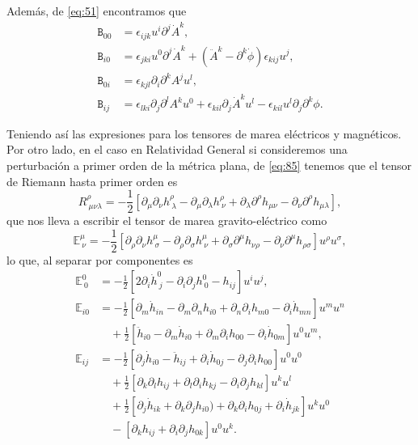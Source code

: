 Además, de \eqref{eq:51} encontramos que
\begin{align}
\mathtt{B}_{00} &= \epsilon_{ijk}u^i \partial^j \dot{A}^k, \\
\mathtt{B}_{i0} &= \epsilon_{jki}u^0 \partial^j\dot{A}^k + (\ddot{A}^k - \partial^k \dot{\phi}) \epsilon_{kij}u^j, \\
\mathtt{B}_{0i} &= \epsilon_{kjl}\partial_i \partial^k A^j u^l, \\
\mathtt{B}_{ij} &= \epsilon_{lki}\partial_j \partial^l A^k u^0 + \epsilon_{kil}\partial_j \dot{A}^k u^l
- \epsilon_{kil} u^l \partial_j \partial^k \phi.
\end{align}

Teniendo así las expresiones para los tensores de marea eléctricos y magnéticos. Por otro lado, en el caso en Relatividad General si consideremos una perturbación a primer orden de la métrica plana, de \eqref{eq:85} tenemos que el tensor de Riemann hasta primer orden es
\begin{equation}
R^{\rho}_{\ \mu \nu \lambda} = -\frac{1}{2} \left[ \partial_{\mu} \partial_{\nu} h^{\rho}_{\ \lambda} - \partial_{\mu} \partial_{\lambda} h^{\rho}_{\ \nu} + \partial_{\lambda} \partial^{\rho} h_{\mu \nu} - \partial_{\nu} \partial^{\rho} h_{\mu \lambda} \right],
\end{equation}
que nos lleva a escribir el tensor de marea gravito-eléctrico como
\begin{equation}
\mathbb{E}^{\mu}_{\ \nu} = -\frac{1}{2} \left[ \partial_{\rho} \partial_{\nu} h^{\mu}_{\ \sigma} - \partial_{\rho} \partial_{\sigma} h^{\mu}_{\ \nu} + \partial_{\sigma} \partial^{\mu} h_{\nu \rho} - \partial_{\nu} \partial^{\mu} h_{\rho \sigma} \right] u^{\rho} u^{\sigma},
\end{equation}
lo que, al separar por componentes es
\begin{align}
\mathbb{E}^0_{\ 0} &= -\frac{1}{2} \left[ 2 \partial_i \dot{h}^0_{\ j} - \partial_i \partial_j h^0_{\ 0} - h_{ij} \right] u^i u^j,\\
\nonumber
\mathbb{E}_{i0} &= -\frac{1}{2} \left[ \partial_m \dot{h}_{in} - \partial_m \partial_n h_{i0} + \partial_n \partial_i h_{m0} - \partial_i \dot{h}_{mn} \right] u^m u^n \\
& \quad + \frac{1}{2} \left[ \ddot{h}_{i0} - \partial_m \dot{h}_{i0} + \partial_m \partial_i h_{00} - \partial_i 
\dot{h}_{0m} \right] u^0 u^m, \\
\nonumber
\mathbb{E}_{ij} &= -\frac{1}{2} \left[ \partial_j \dot{h}_{i0} - \ddot{h}_{ij} + \partial_i \dot{h}_{0j} - \partial_j \partial_i h_{00} \right] u^0 u^0 \\
\nonumber
& \quad + \frac{1}{2} \left[ \partial_k \partial_l h_{ij} + \partial_l \partial_i h_{kj} - \partial_i \partial_j h_{kl} \right] u^k u^l\\
\nonumber
& \quad + \frac{1}{2} \left[ \partial_j \dot{h}_{ik} + \partial_k \partial_j h_{i0}) + \partial_k \partial_i h_{0j} + \partial_i \dot{h}_{jk} \right] u^k u^0\\
& \quad - \left[ \partial_k h_{ij} + \partial_i \partial_j h_{0k} \right] u^0 u^k.
\end{align}

